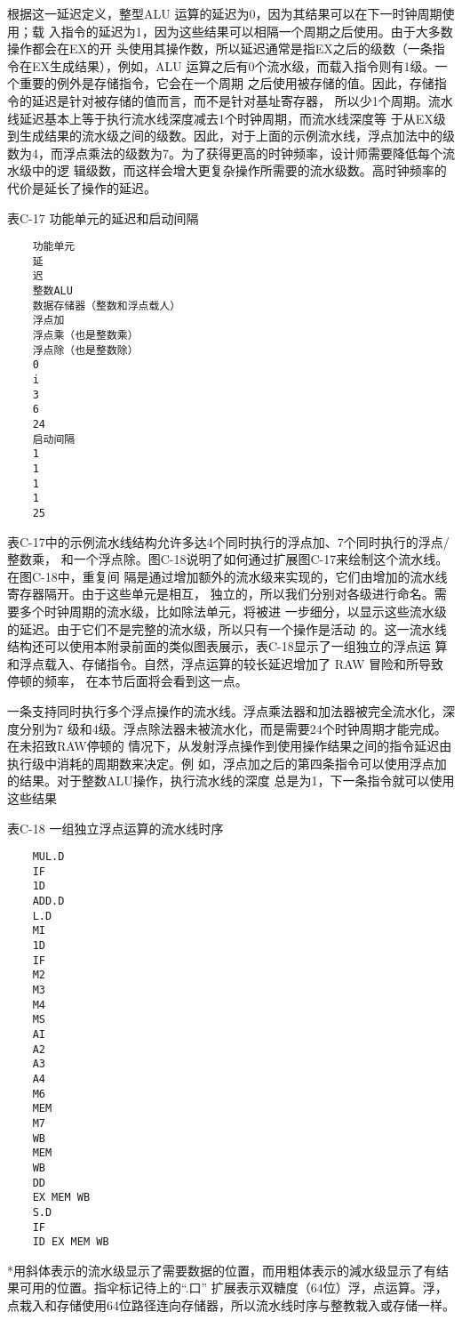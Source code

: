 根据这一延迟定义，整型ALU 运算的延迟为0，因为其结果可以在下一时钟周期使用；载
入指令的延迟为1，因为这些结果可以相隔一个周期之后使用。由于大多数操作都会在EX的开
头使用其操作数，所以延迟通常是指EX之后的级数（一条指令在EX生成结果），例如，ALU
运算之后有0个流水级，而载入指令则有1级。一个重要的例外是存储指令，它会在一个周期
之后使用被存储的值。因此，存储指令的延迟是针对被存储的值而言，而不是针对基址寄存器，
所以少1个周期。流水线延迟基本上等于执行流水线深度减去1个时钟周期，而流水线深度等
于从EX级到生成结果的流水级之间的级数。因此，对于上面的示例流水线，浮点加法中的级
数为4，而浮点乘法的级数为7。为了获得更高的时钟频率，设计师需要降低每个流水级中的逻
辑级数，而这样会增大更复杂操作所需要的流水级数。高时钟频率的代价是延长了操作的延迟。

表C-17 功能单元的延迟和启动间隔
\begin{verbatim}
    功能单元
    延
    迟
    整数ALU
    数据存储器（整数和浮点载人）
    浮点加
    浮点乘（也是整数乘）
    浮点除（也是整数除）
    0
    i
    3
    6
    24
    启动间隔
    1
    1
    1
    1
    25
\end{verbatim}
表C-17中的示例流水线结构允许多达4个同时执行的浮点加、7个同时执行的浮点/整数乘，
和一个浮点除。图C-18说明了如何通过扩展图C-17来绘制这个流水线。在图C-18中，重复间
隔是通过增加额外的流水级来实现的，它们由增加的流水线寄存器隔开。由于这些单元是相互，
独立的，所以我们分别对各级进行命名。需要多个时钟周期的流水级，比如除法单元，将被进
一步细分，以显示这些流水级的延迟。由于它们不是完整的流水级，所以只有一个操作是活动
的。这一流水线结构还可以使用本附录前面的类似图表展示，表C-18显示了一组独立的浮点运
算和浮点载入、存储指令。自然，浮点运算的较长延迟增加了 RAW 冒险和所导致停顿的频率，
在本节后面将会看到这一点。

一条支持同时执行多个浮点操作的流水线。浮点乘法器和加法器被完全流水化，深度分别为7
级和4级。浮点除法器未被流水化，而是需要24个时钟周期才能完成。在未招致RAW停顿的
情况下，从发射浮点操作到使用操作结果之间的指令延迟由执行级中消耗的周期数来决定。例
如，浮点加之后的第四条指令可以使用浮点加的结果。对于整数ALU操作，执行流水线的深度
总是为1，下一条指令就可以使用这些结果

表C-18
一组独立浮点运算的流水线时序
\begin{verbatim}
    MUL.D
    IF
    1D
    ADD.D
    L.D
    MI
    1D
    IF
    M2
    M3
    M4
    MS
    AI
    A2
    A3
    A4
    M6
    MEM
    M7
    WB
    MEM
    WB
    DD
    EX MEM WB
    S.D
    IF
    ID EX MEM WB
\end{verbatim}
*用斜体表示的流水级显示了需要数据的位置，而用粗体表示的減水级显示了有结果可用的位置。指伞标记待上的“.口”
扩展表示双糖度（64位）浮，点运算。浮，点栽入和存储使用64位路径连向存储器，所以流水线时序与整教栽入或存储一样。

